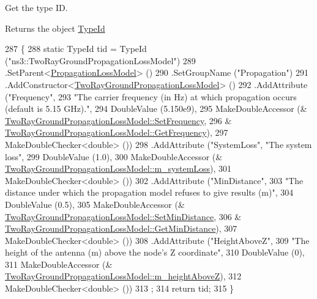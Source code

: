 Get the type ID. 

\begin{DoxyReturn}{Returns}
the object \hyperlink{classns3_1_1TypeId}{Type\+Id} 
\end{DoxyReturn}

\begin{DoxyCode}
287 \{
288   \textcolor{keyword}{static} TypeId tid = TypeId (\textcolor{stringliteral}{"ns3::TwoRayGroundPropagationLossModel"})
289     .SetParent<\hyperlink{classns3_1_1PropagationLossModel_ace8b78c2c8e805cd0a919d7e3543318c}{PropagationLossModel}> ()
290     .SetGroupName (\textcolor{stringliteral}{"Propagation"})
291     .AddConstructor<\hyperlink{classns3_1_1TwoRayGroundPropagationLossModel_a3f81edd7dca7de8a299d61c6582989bb}{TwoRayGroundPropagationLossModel}> ()
292     .AddAttribute (\textcolor{stringliteral}{"Frequency"}, 
293                    \textcolor{stringliteral}{"The carrier frequency (in Hz) at which propagation occurs  (default is 5.15 GHz)."},
294                    DoubleValue (5.150e9),
295                    MakeDoubleAccessor (&
      \hyperlink{classns3_1_1TwoRayGroundPropagationLossModel_a9117993a967cfc85ba639030961b6528}{TwoRayGroundPropagationLossModel::SetFrequency},
296                                        &
      \hyperlink{classns3_1_1TwoRayGroundPropagationLossModel_aa901d678daedea6436f053ebbe8dee2f}{TwoRayGroundPropagationLossModel::GetFrequency}),
297                    MakeDoubleChecker<double> ())
298     .AddAttribute (\textcolor{stringliteral}{"SystemLoss"}, \textcolor{stringliteral}{"The system loss"},
299                    DoubleValue (1.0),
300                    MakeDoubleAccessor (&
      \hyperlink{classns3_1_1TwoRayGroundPropagationLossModel_a944fc5bdc91fb21e200374a5f415d826}{TwoRayGroundPropagationLossModel::m\_systemLoss}),
301                    MakeDoubleChecker<double> ())
302     .AddAttribute (\textcolor{stringliteral}{"MinDistance"},
303                    \textcolor{stringliteral}{"The distance under which the propagation model refuses to give results (m)"},
304                    DoubleValue (0.5),
305                    MakeDoubleAccessor (&
      \hyperlink{classns3_1_1TwoRayGroundPropagationLossModel_a7b35af004bb79436372172f779753e5f}{TwoRayGroundPropagationLossModel::SetMinDistance},
306                                        &
      \hyperlink{classns3_1_1TwoRayGroundPropagationLossModel_aca9770656137034f53f8e750c6fb58bc}{TwoRayGroundPropagationLossModel::GetMinDistance}),
307                    MakeDoubleChecker<double> ())
308     .AddAttribute (\textcolor{stringliteral}{"HeightAboveZ"},
309                    \textcolor{stringliteral}{"The height of the antenna (m) above the node's Z coordinate"},
310                    DoubleValue (0),
311                    MakeDoubleAccessor (&
      \hyperlink{classns3_1_1TwoRayGroundPropagationLossModel_a3b383aac3f7bf082f1bb15ca6b1efd3f}{TwoRayGroundPropagationLossModel::m\_heightAboveZ}),
312                    MakeDoubleChecker<double> ())
313   ;
314   \textcolor{keywordflow}{return} tid;
315 \}
\end{DoxyCode}


